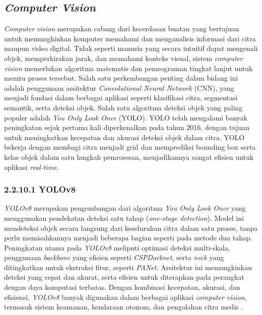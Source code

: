 \subsection{\emph{Computer Vision}}

\emph{Computer vision} merupakan cabang dari kecerdasan buatan yang bertujuan untuk memungkinkan komputer memahami dan menganalisis informasi dari citra maupun video digital. Tidak seperti manusia yang secara intuitif dapat mengenali objek, memperkirakan jarak, dan memahami konteks visual, sistem \emph{computer vision} memerlukan algoritma matematis dan pemrograman tingkat lanjut untuk meniru proses tersebut. Salah satu perkembangan penting dalam bidang ini adalah penggunaan arsitektur \emph{Convolutional Neural Network} (CNN), yang menjadi fondasi dalam berbagai aplikasi seperti klasifikasi citra, segmentasi semantik, serta deteksi objek. Salah satu algoritma deteksi objek yang paling populer adalah \emph{You Only Look Once} (YOLO). YOLO telah mengalami banyak peningkatan sejak pertama kali diperkenalkan pada tahun 2016, dengan tujuan untuk meningkatkan kecepatan dan akurasi deteksi objek dalam citra. YOLO bekerja dengan membagi citra menjadi grid dan memprediksi bounding box serta kelas objek dalam satu langkah pemrosesan, menjadikannya sangat efisien untuk aplikasi \emph{real-time}.


\subsubsection{2.2.10.1 YOLOv8}
\emph{YOLOv8} merupakan pengembangan dari algoritma \emph{You Only Look Once} yang menggunakan pendekatan deteksi satu tahap (\emph{one-stage detection}). Model ini mendeteksi objek secara langsung dari keseluruhan citra dalam satu proses, tanpa perlu memisahkannya menjadi beberapa bagian seperti pada metode dua tahap. Peningkatan utama pada \emph{YOLOv8} meliputi optimasi deteksi multi-skala, penggunaan \emph{backbone} yang efisien seperti \emph{CSPDarknet}, serta \emph{neck} yang ditingkatkan untuk ekstraksi fitur, seperti \emph{PANet}. Arsitektur ini memungkinkan deteksi yang cepat dan akurat, serta efisien untuk diterapkan pada perangkat dengan daya komputasi terbatas.  Dengan kombinasi kecepatan, akurasi, dan efisiensi, \emph{YOLOv8} banyak digunakan dalam berbagai aplikasi \emph{computer vision}, termasuk sistem keamanan, kendaraan otonom, dan pengolahan citra medis \cite{yolov8}.



